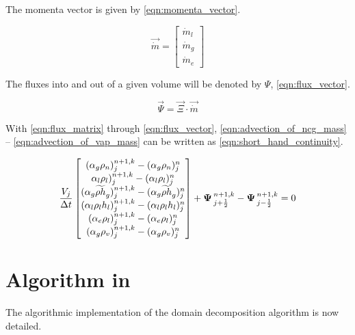 The momenta vector is given by \eqref{eqn:momenta_vector}.

\begin{equation}
\label{eqn:momenta_vector}
\vec{\dot{m}} = \begin{bmatrix}
\dot{m}_{l} \\
\dot{m}_{g} \\
\dot{m}_{e}
\end{bmatrix}
\end{equation}

The fluxes into and out of a given volume will be denoted by $\Psi$, \eqref{eqn:flux_vector}.

\begin{equation}
\label{eqn:flux_vector}
\vec{\Psi} = \vec{\Xi} \cdot \vec{\dot{m}}
\end{equation}


With \eqref{eqn:flux_matrix} through \eqref{eqn:flux_vector}, \eqref{eqn:advection_of_ncg_mass} -- \eqref{eqn:advection_of_vap_mass} can be written as \eqref{eqn:short_hand_continuity}.

\begin{equation}
\label{eqn:short_hand_continuity}
\frac{V_j}{\dt} \begin{bmatrix}
(\alpha_{g} \rho_{n})^{n+1, k}_{j} - (\alpha_{g} \rho_{n})^{n}_{j} \\
\alpha_{l} \rho_{l})^{n+1, k}_{j} - (\alpha_{l} \rho_{l})^{n}_{j} \\
(\alpha_{g} \widetilde{\rho h}_{g})^{n+1, k}_{j} - (\alpha_{g} \widetilde{\rho h}_{g})^{n}_{j}  \\
(\alpha_{l} \rho_{l} h_{l})^{n+1, k}_{j} - (\alpha_{l} \rho_{l} h_{l} )^{n}_{j} \\
(\alpha_{e} \rho_{l})^{n+1, k}_{j} - (\alpha_{e} \rho_{l})^{n}_{j} \\
(\alpha_{g} \rho_{v})^{n+1, k}_{j} - (\alpha_{g} \rho_{v})^{n}_{j} 
\end{bmatrix} + \vec{\Psi}^{n+1, k}_{j + \onehalf} - \vec{\Psi}^{n+1, k}_{j - \onehalf}= 0
\end{equation}



\section{Algorithm in \cobra{}}
\label{sec:dd:algo}

The algorithmic implementation of the domain decomposition algorithm is now detailed.



